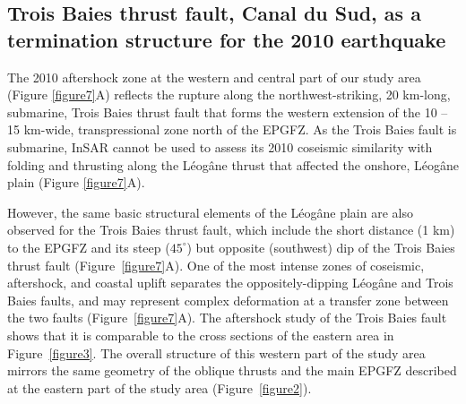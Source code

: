 \documentclass[linenumbers,draft]{agujournal}
\begin{document}
\subsection{Trois Baies thrust fault, Canal du Sud, as a termination structure for the 2010 earthquake}
The 2010 aftershock zone at the western and central part of our study area (Figure \ref{figure7}A) reflects the rupture along the northwest-striking, 20 km-long, submarine, Trois Baies thrust fault that forms the western extension of the 10 -- 15 km-wide, transpressional zone north of the EPGFZ. As the Trois Baies fault is submarine, InSAR cannot be used to assess its 2010 coseismic similarity with folding and thrusting along the L\'eog\^ane thrust that affected the onshore, L\'eog\^ane plain (Figure \ref{figure7}A). 

However, the same basic structural elements of the L\'eog\^ane plain are also observed for the Trois Baies thrust fault, which include the short distance (1 km) to the EPGFZ and its steep ($45^{\circ}$) but opposite (southwest) dip of the Trois Baies thrust fault (Figure~\ref{figure7}A). One of the most intense zones of coseismic, aftershock, and coastal uplift separates the oppositely-dipping L\'eog\^ane and Trois Baies faults, and may represent complex deformation at a transfer zone between the two faults (Figure~\ref{figure7}A). The aftershock study of the Trois Baies fault \citep{symithe2016present} shows that it is comparable to the cross sections of the eastern area in Figure~\ref{figure3}. The overall structure of this western part of the study area mirrors the same geometry of the oblique thrusts and the main EPGFZ described at the eastern part of the study area (Figure~\ref{figure2}).
\end{document}
